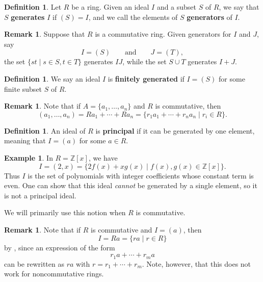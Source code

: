 \documentclass[12pt]{report}
\numberwithin{equation}{section}
\numberwithin{theorem}{chapter}
\theoremstyle{definition}
\newtheorem{definition}[theorem]{Definition}
\newtheorem{example}[theorem]{Example}
\newtheorem*{basic properties}{Basic Properties}
\newtheorem*{Important Remark}{Important Remark}
\newtheorem{remark}[theorem]{Remark}
\newcommand{\Z}{\mathbb{Z}}
\begin{document}
\begin{definition}
Let $R$ be a ring. Given an ideal $I$ and a subset $S$ of $R$, we say that $S$ {\bf generates} $I$ if $(S) = I$, and we call the elements of $S$ {\bf generators} of $I$.
\end{definition}



\begin{remark}
Suppose that $R$ is a commutative ring. Given generators for $I$ and $J$, say
	$$I = (S) \qquad \text{and} \qquad J = (T),$$
	the set $\{ st \mid s \in S, t \in T \}$
	generates $IJ$, while the set $S \cup T$ generates $I + J$.
\end{remark}


\begin{definition}
We say an ideal $I$ is {\bf finitely generated} if $I = (S)$ for some finite subset $S$ of $R$.
\end{definition}


\begin{remark}
Note that if  $A = \{a_1, \dots, a_n \}$ and $R$ is commutative, then 
$$(a_1, \ldots, a_n) = Ra_1 + \cdots + Ra_n = \{r_1a_1 + \cdots + r_na_n \mid r_i \in R\}.$$ 
\end{remark}




\begin{definition}
An ideal of $R$ is {\bf principal} if it can be generated by one element, meaning that $I = (a)$ for some $a \in R$.
\end{definition}

\begin{example}\label{(2,x) not principal}
	In $R = \Z[x]$, we have 
$$I = (2 , x) = \{2f(x)+xg(x) \mid f(x), g(x) \in\Z[x]\}.$$ 
Thus $I$ is the set of polynomials with integer coefficients whose constant term is
  even. One can show that this ideal {\em cannot} be generated by a single element, so it is not a principal ideal.
\end{example}


We will primarily use this notion when $R$ is commutative. 

\begin{remark}
Note that if $R$ is commutative and $I = (a)$, then 
$$I = Ra = \{ra \mid r \in R\}$$ by , since an expression of the form 
$$r_1 a + \cdots + r_m a$$ 
can be rewritten as $ra$ with $r = r_1+ \cdots + r_m$. Note, however, that this does not work for noncommutative rings.
\end{remark}
\end{document}
